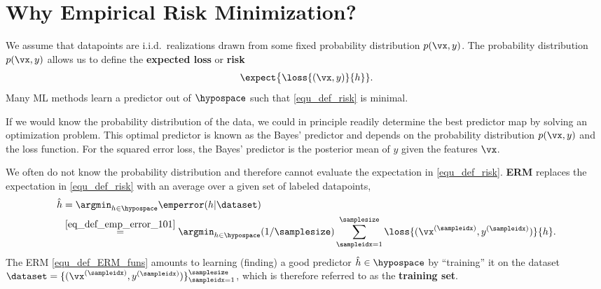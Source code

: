 \documentclass[12pt]{report}
\begin{document}

\section{Why Empirical Risk Minimization?} 
\label{equ_sec_emp_risk_approximates_expected_loss}

We assume that datapoints are i.i.d.\ realizations drawn from some fixed 
probability distribution $p(\vx,y)$. The probability distribution $p(\vx,y)$ 
allows us to define the {\bf expected loss} or {\bf risk} 
\begin{equation}
\label{equ_def_risk} 
\expect \big \{ \loss{(\vx,y)}{h} \}.
\end{equation}
Many ML methods learn a predictor out of $\hypospace$ such 
that \eqref{equ_def_risk} is minimal. 

If we would know the probability distribution of the data, we could 
in principle readily determine the best predictor map by solving an 
optimization problem. This optimal predictor is known as the Bayes' 
predictor and depends on the probability distribution $p(\vx,y)$ 
and the loss function. For the squared error loss, the Bayes' 
predictor is the posterior mean of $y$ given the features $\vx$. 

We often do not know the probability distribution and therefore 
cannot evaluate the expectation in \eqref{equ_def_risk}. 
 {\bf ERM} replaces the expectation in  \eqref{equ_def_risk} with an average 
 over a given set of labeled datapoints,  
\begin{align}
\label{equ_def_ERM_funs}
   \hat{h} & = \argmin_{h \in \hypospace} \emperror(h|\dataset) \nonumber \\ 
   & \stackrel{\eqref{eq_def_emp_error_101}}{=}  \argmin_{h \in \hypospace} (1/\samplesize) \sum_{\sampleidx=1}^{\samplesize} \loss{(\vx^{(\sampleidx)},y^{(\sampleidx)})}{h}.
\end{align}
The ERM \eqref{equ_def_ERM_funs} amounts to learning (finding) a 
good predictor $\hat{h} \in \hypospace$ by ``training'' it on the 
dataset $\dataset = \{ (\vx^{(\sampleidx)},y^{(\sampleidx)}) \}_{\sampleidx=1}^{\samplesize}$, 
which is therefore referred to as the {\bf training set}. 
\end{document}

